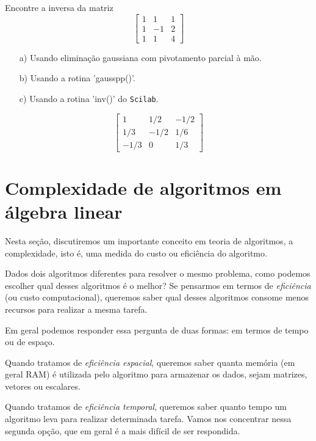 \ifisscilab
\begin{exer} Encontre a inversa da matriz
$$\left[
\begin{array}{ccc}
1&1&1\\
1&-1&2\\
1&1&4
\end{array}\right]$$
\begin{itemize}
\item[a)] Usando eliminação gaussiana com pivotamento parcial à mão.
\item[b)] Usando a rotina 'gausspp()'.
\item[c)] Usando a rotina 'inv()' do \verb+Scilab+.
\end{itemize}
\end{exer}
\begin{resp}
  
 $$ \left[ \begin {array}{ccc} 1&1/2&-1/2\\1/3&-1/2&1/6
\\-1/3&0&1/3\end {array} \right] $$    
  
\end{resp}
\fi



\section{Complexidade de algoritmos em álgebra linear}
Nesta seção, discutiremos um importante conceito em teoria de algoritmos, a complexidade, isto é, uma medida do custo ou eficiência do algoritmo.

Dados dois algoritmos diferentes para resolver o mesmo problema, como podemos escolher qual desses algoritmos é o melhor? Se pensarmos em termos de \emph{eficiência} (ou custo computacional), queremos saber qual desses algoritmos consome menos recursos para realizar a mesma tarefa.

Em geral podemos responder essa pergunta de duas formas: em termos de tempo ou de espaço.

Quando tratamos de \emph{eficiência espacial}, queremos saber quanta memória (em geral RAM) é utilizada pelo algoritmo para armazenar os dados, sejam matrizes, vetores ou escalares.

Quando tratamos de \emph{eficiência temporal}, queremos saber quanto tempo um algoritmo leva para realizar determinada tarefa. Vamos nos concentrar nessa segunda opção, que em geral é a mais difícil de ser respondida.

